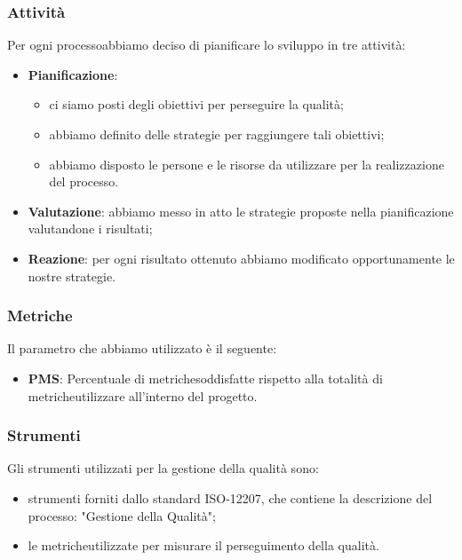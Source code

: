 \subsubsection{Attività}
Per ogni processo\glosp abbiamo deciso di pianificare lo sviluppo in tre attività:
\begin{itemize}
	\item \textbf{Pianificazione}:
		\begin{itemize}
			\item ci siamo posti degli obiettivi per perseguire la qualità;
			\item abbiamo definito delle strategie per raggiungere tali obiettivi;
			\item abbiamo disposto le persone e le risorse da utilizzare per la realizzazione del processo\glo.
		\end{itemize}
	\item \textbf{Valutazione}: abbiamo messo in atto le strategie proposte nella pianificazione valutandone i risultati;
	\item \textbf{Reazione}: per ogni risultato ottenuto abbiamo modificato opportunamente le nostre strategie.
\end{itemize}
\subsubsection{Metriche}
Il parametro che abbiamo utilizzato è il seguente:
	\begin{itemize}
		\item \textbf{PMS}: Percentuale di metriche\glosp soddisfatte rispetto alla totalità di metriche\glosp utilizzare all'interno del progetto\glo.
	\end{itemize}
\subsubsection{Strumenti}
Gli strumenti utilizzati per la gestione della qualità sono:
\begin{itemize}
	\item strumenti forniti dallo standard ISO-12207, che contiene la descrizione del processo\glo: "Gestione della Qualità";
	\item le metriche\glosp utilizzate per misurare il perseguimento della qualità.
\end{itemize}

